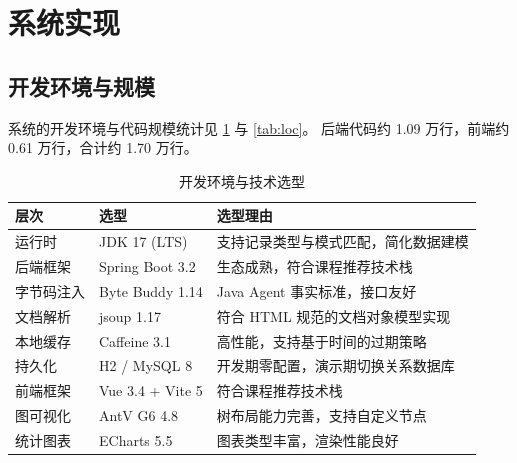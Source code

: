 \section{系统实现}
\label{sec:implementation}

\subsection{开发环境与规模}

系统的开发环境与代码规模统计见 \cref{tab:dev-env} 与 \cref{tab:loc}。
后端代码约 1.09 万行，前端约 0.61 万行，合计约 1.70 万行。

\begin{table}[htbp]
\centering
\caption{开发环境与技术选型}
\label{tab:dev-env}
\small
\begin{tabular}{@{}l l l@{}}
\toprule
\textbf{层次} & \textbf{选型} & \textbf{选型理由} \\
\midrule
运行时     & JDK 17 (LTS)      & 支持记录类型与模式匹配，简化数据建模 \\
后端框架   & Spring Boot 3.2   & 生态成熟，符合课程推荐技术栈 \\
字节码注入 & Byte Buddy 1.14   & Java Agent 事实标准，接口友好 \\
文档解析   & jsoup 1.17        & 符合 HTML 规范的文档对象模型实现 \\
本地缓存   & Caffeine 3.1      & 高性能，支持基于时间的过期策略 \\
持久化     & H2 / MySQL 8      & 开发期零配置，演示期切换关系数据库 \\
前端框架   & Vue 3.4 + Vite 5  & 符合课程推荐技术栈 \\
图可视化   & AntV G6 4.8       & 树布局能力完善，支持自定义节点 \\
统计图表   & ECharts 5.5       & 图表类型丰富，渲染性能良好 \\
\bottomrule
\end{tabular}
\end{table}

